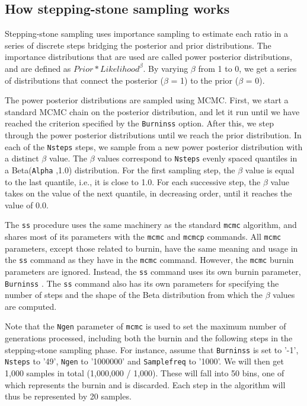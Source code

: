 \documentclass[12pt]{book}
\newcommand{\ttt}[1]{\texttt{#1} }
\begin{document}
\subsection{How stepping-stone sampling works}

Stepping-stone sampling uses importance sampling to estimate each ratio in a series of discrete
steps bridging the posterior and prior distributions.  The importance distributions that are used
are called power posterior distributions, and are defined as $Prior*Likelihood^{\beta}$. By varying
$\beta$ from 1 to 0, we get a series of distributions that connect the posterior ($\beta$ = 1) to
the prior ($\beta$ = 0).

The power posterior distributions are sampled using MCMC. First, we start a standard MCMC chain on
the posterior distribution, and let it run until we have reached the criterion specified by the
\ttt{Burninss} option. After this, we step through the power posterior distributions until we reach
the prior distribution.  In each of the \ttt{Nsteps} steps, we sample from a new power posterior
distribution with a distinct $\beta$ value. The $\beta$ values correspond to \ttt{Nsteps} evenly
spaced quantiles in a Beta(\ttt{Alpha},1.0) distribution.  For the first sampling step, the $\beta$
value is equal to the last quantile, i.e., it is close to 1.0. For each successive step, the
$\beta$ value takes on the value of the next quantile, in decreasing order, until it reaches the
value of 0.0.


The \ttt{ss} procedure uses the same machinery as the standard \ttt{mcmc} algorithm, and shares
most of its parameters with the \ttt{mcmc} and \ttt{mcmcp} commands. All \ttt{mcmc} parameters,
except those related to burnin, have the same meaning and usage in the \ttt{ss} command as they
have in the \ttt{mcmc} command. However, the \ttt{mcmc} burnin parameters are ignored. Instead, the
\ttt{ss} command uses its own burnin parameter, \ttt{Burninss}. The \ttt{ss} command also has its
own parameters for specifying the number of steps and the shape of the Beta distribution from which
the $\beta$ values are computed.

Note that the \ttt{Ngen} parameter of \ttt{mcmc} is used to set the maximum number of generations
processed, including both the burnin and the following steps in the stepping-stone sampling phase.
For instance, assume that \ttt{Burninss} is set to '-1', \ttt{Nsteps} to '49', \ttt{Ngen} to
'1000000' and \ttt{Samplefreq} to '1000'.  We will then get 1,000 samples in total (1,000,000 /
1,000). These will fall into 50 bins, one of which represents the burnin and is discarded. Each
step in the algorithm will thus be represented by 20 samples.
\end{document}
